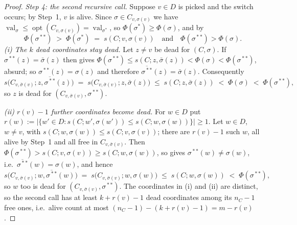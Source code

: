 \documentclass[11pt]{article}
\theoremstyle{plain}
\theoremstyle{definition}
\DeclareMathOperator{\val}{val}
\DeclareMathOperator{\opt}{opt}
\begin{document}
\begin{proof}
\smallskip\noindent\emph{Step 4: the second recursive call.}
Suppose $v\in D$ is picked and the switch occurs; by Step~1, $v$ is
alive. Since $\sigma\in C_{v,\sigma(v)}$ we have
$\val_\sigma\le\opt(C_{v,\sigma(v)})=\val_{\sigma^{\!*}}$, so
$\Phi(\sigma^{\!*})\ge\Phi(\sigma)$, and by 
\[
  \Phi(\sigma^{\!**})\;>\;\Phi(\sigma^{\!*})\;=\;s(C;v,\sigma(v))
  \quad\text{and}\quad \Phi(\sigma^{\!**})>\Phi(\sigma).
\]
\emph{(i) The $k$ dead coordinates stay dead.} Let $z\ne v$ be dead for
$(C,\sigma)$. If $\sigma^{\!**}(z)=\bar\sigma(z)$ then
 gives
$\Phi(\sigma^{\!**})\le s(C;z,\bar\sigma(z))<\Phi(\sigma)<\Phi(\sigma^{\!**})$,
absurd; so $\sigma^{\!**}(z)=\sigma(z)$ and therefore
$\overline{\sigma^{\!**}}(z)=\bar\sigma(z)$. Consequently
\[
  s\bigl(C_{v,\bar\sigma(v)};z,\overline{\sigma^{\!**}}(z)\bigr)
  \;=\;s\bigl(C_{v,\bar\sigma(v)};z,\bar\sigma(z)\bigr)
  \;\le\;s(C;z,\bar\sigma(z))\;<\;\Phi(\sigma)\;<\;\Phi(\sigma^{\!**}),
\]
so $z$ is dead for $(C_{v,\bar\sigma(v)},\sigma^{\!**})$.

\emph{(ii) $r(v)-1$ further coordinates become dead.} For $w\in D$ put
$r(w):=\bigl|\{w'\in D: s(C;w',\sigma(w'))\le s(C;w,\sigma(w))\}\bigr|\ge1$.
Let $w\in D$, $w\ne v$, with $s(C;w,\sigma(w))\le s(C;v,\sigma(v))$;
there are $r(v)-1$ such $w$, all alive by Step~1 and all free in
$C_{v,\bar\sigma(v)}$. Then
$\Phi(\sigma^{\!**})>s(C;v,\sigma(v))\ge s(C;w,\sigma(w))$, so
 gives $\sigma^{\!**}(w)\ne\sigma(w)$, i.e.\
$\overline{\sigma^{\!**}}(w)=\sigma(w)$, and hence
\[
  s\bigl(C_{v,\bar\sigma(v)};w,\overline{\sigma^{\!**}}(w)\bigr)
  \;=\;s\bigl(C_{v,\bar\sigma(v)};w,\sigma(w)\bigr)
  \;\le\;s(C;w,\sigma(w))\;<\;\Phi(\sigma^{\!**}),
\]
so $w$ too is dead for $(C_{v,\bar\sigma(v)},\sigma^{\!**})$. The
coordinates in (i) and (ii) are distinct, so the second call has at least
$k+r(v)-1$ dead coordinates among its $n_C-1$ free ones, i.e.\ alive
count at most $(n_C-1)-(k+r(v)-1)=m-r(v)$.


\end{proof}
\end{document}
